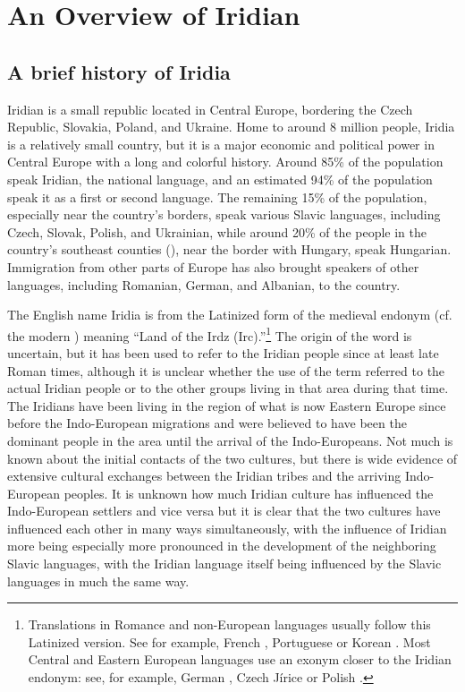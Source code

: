 \chapter{An Overview of Iridian}

\section{A brief history of Iridia}

Iridian is a small republic located in Central Europe, bordering the Czech Republic, Slovakia, Poland, and Ukraine. Home to around 8 million people, Iridia is a relatively small country, but it is a major economic and political power in Central Europe with a long and colorful history. Around 85\% of the population speak Iridian, the national language, and an estimated 94\% of the population speak it as a first or second language. The remaining 15\% of the population, especially near the country's borders, speak various Slavic languages, including Czech, Slovak, Polish, and Ukrainian, while around 20\% of the people in the country's southeast counties (), near the border with Hungary, speak Hungarian. Immigration from other parts of Europe has also brought speakers of other languages, including Romanian, German, and Albanian, to the country.

The English name Iridia is from the Latinized form of the medieval endonym  (cf. the modern ) meaning ``Land of the Irdz (Irc).''\footnote{
    Translations in Romance and non-European languages usually follow this Latinized version. See for example, French , Portuguese  or Korean . Most Central and Eastern European languages use an exonym closer to the Iridian endonym: see, for example, German , Czech Jírice or Polish .}
The origin of the word  is uncertain, but it has been used to refer to the Iridian people since at least late Roman times, although it is unclear whether the use of the term referred to the actual Iridian people or to the other groups living in that area during that time. The Iridians have been living in the region of what is now Eastern Europe since before the Indo-European migrations and were believed to have been the dominant people in the area until the arrival of the Indo-Europeans. Not much is known about the initial contacts of the two cultures, but there is wide evidence of extensive cultural exchanges between the Iridian tribes and the arriving Indo-European peoples. It is unknown how much Iridian culture has influenced the Indo-European settlers and vice versa but it is clear that the two cultures have influenced each other in many ways simultaneously, with the influence of Iridian more being especially more pronounced in the development of the neighboring Slavic languages, with the Iridian language itself being influenced by the Slavic languages in much the same way.

